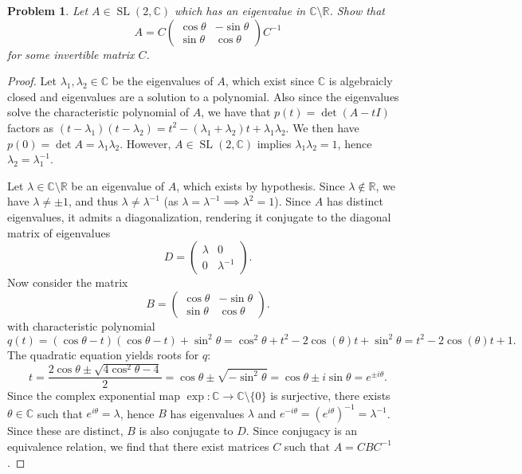 \documentclass[11pt, letterpaper]{article}
\theoremstyle{plain}
\newtheorem{problem}{Problem}
\begin{document}
\begin{problem}
    Let $A \in \operatorname{SL}(2, \mathbb{C})$ which has an eigenvalue in $\mathbb{C} \setminus \mathbb{R} $. Show that
    \[
    	A=C \begin{pmatrix}
    	\cos \theta  & -\sin \theta  \\
    	\sin \theta  & \cos \theta 
    	\end{pmatrix}C^{-1} 
    \]
    for some invertible matrix $C$.
\end{problem}
\begin{proof}
	Let $\lambda _1,\lambda _2\in\mathbb{C} $ be the eigenvalues of $A$, which exist since $\mathbb{C} $ is algebraicly closed and eigenvalues are a solution to a polynomial. Also since the eigenvalues solve the characteristic polynomial of $A$, we have that $p(t)=\det (A-tI)$ factors as $(t-\lambda _1)(t-\lambda _2)=t^2-(\lambda _1+\lambda _2)t+\lambda _1\lambda _2$. We then have $p(0)=\det A = \lambda _1\lambda _2$. However, $A\in \operatorname{SL} (2,\mathbb{C} )$ implies $\lambda _1\lambda _2=1$, hence $\lambda _2=\lambda _1 ^{-1} $.

    Let $\lambda \in\mathbb{C} \setminus \mathbb{R} $ be an eigenvalue of $A$, which exists by hypothesis. Since $\lambda \notin \mathbb{R}$, we have $\lambda \neq \pm 1$, and thus $\lambda \neq \lambda^{-1}$ (as $\lambda = \lambda^{-1} \implies \lambda^2 = 1$). Since $A$ has distinct eigenvalues, it admits a diagonalization, rendering it conjugate to the diagonal matrix of eigenvalues
    \[
        D= \begin{pmatrix} \lambda & 0 \\ 0 & \lambda^{-1} \end{pmatrix}.
    \]
    Now consider the matrix
    \[
        B = \begin{pmatrix}
        \cos \theta & -\sin \theta \\
        \sin \theta & \cos \theta
        \end{pmatrix}.
    \]
    with characteristic polynomial
    \[
    	q(t)=(\cos \theta -t)(\cos \theta -t)+\sin ^2\theta =\cos ^2\theta +t^2-2 \cos (\theta )t+\sin ^2\theta =t^2-2 \cos (\theta )t+1
    .\]
    The quadratic equation yields roots for $q$:
    \[
    	t=\frac{2 \cos \theta \pm \sqrt{4 \cos ^2\theta -4} }{2} =\cos \theta \pm \sqrt{- \sin ^2\theta } =\cos \theta \pm i \sin \theta =e^{\pm i\theta } 
    .\]
    Since the complex exponential map $\exp: \mathbb{C} \to \mathbb{C} \setminus \{0\}$ is surjective, there exists $\theta \in \mathbb{C}$ such that $e^{i\theta} = \lambda$, hence $B$ has eigenvalues $\lambda$ and $e^{-i\theta } =(e^{i\theta } )^{-1} =\lambda^{-1}$. Since these are distinct, $B$ is also conjugate to $D$. Since conjugacy is an equivalence relation, we find that there exist matrices $C$ such that $A=CBC ^{-1} $.
\end{proof}
\end{document}
